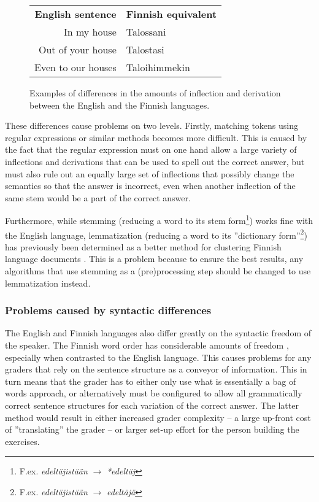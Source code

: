 \documentclass[english]{tktltiki2}
\theoremstyle{definition}
\theoremstyle{remark}
\begin{document}
\begin{figure}[h!]

	\centering

	\begin{tabular}{r|l}
		\textbf{English sentence}
		& \textbf{Finnish equivalent}
		\\
		In my house
		& Talossani
		\\		
		Out of your house
		& Talostasi
		\\
		Even to our houses
		& Taloihimmekin
	
	\end{tabular}

	\caption{Examples of differences in the amounts of inflection and derivation between the English and the Finnish languages.}
	\label{fig:eng-vs-fin-inflection}
\end{figure}

These differences cause problems on two levels. Firstly, matching tokens using regular expressions or similar methods becomes more difficult. This is caused by the fact that the regular expression must on one hand allow a large variety of inflections and derivations that can be used to spell out the correct answer, but must also rule out an equally large set of inflections that possibly change the semantics so that the answer is incorrect, even when another inflection of the same stem would be a part of the correct answer.

Furthermore, while stemming (reducing a word to its stem form\footnote{F.ex. \emph{edeltäjistään} $\rightarrow$ \emph{*edeltäj}}) works fine with the English language, lemmatization (reducing a word to its ''dictionary form''\footnote{F.ex. \emph{edeltäjistään} $\rightarrow$ \emph{edeltäjä}}) has previously been determined as a better method for clustering Finnish language documents \cite{korenius04}. This is a problem because to ensure the best results, any algorithms that use stemming as a (pre)processing step should be changed to use lemmatization instead.

\subsubsection{Problems caused by syntactic differences}

The English and Finnish languages also differ greatly on the syntactic freedom of the speaker. The Finnish word order has considerable amounts of freedom \cite{karttunen85}, especially when contrasted to the English language. This causes problems for any graders that rely on the sentence structure as a conveyor of information. This in turn means that the grader has to either only use what is essentially a bag of words approach, or alternatively must be configured to allow all grammatically correct sentence structures for each variation of the correct answer. The latter method would result in either increased grader complexity -- a large up-front cost of ''translating'' the grader -- or larger set-up effort for the person building the exercises.
\end{document}
